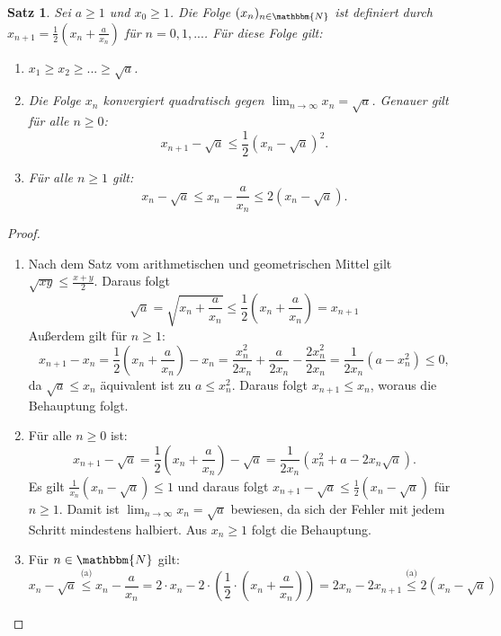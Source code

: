 \documentclass[12pt]{article}
\newcommand{\N}{\mathbbm{N}} %
\newtheorem{satz}{Satz}[section]
\begin{document}
\begin{satz}
    Sei $a \geq 1$ und $x_0 \geq 1$. Die Folge $(x_n)_{n \in \N}$ ist definiert durch $x_{n+1}= \frac{1}{2}\left(x_n+ \frac{a}{x_n}\right)$ für $n=0,1,...$. Für diese Folge gilt:
    \begin{enumerate}[label=(\alph*)]
        \item $x_1 \geq x_2 \geq ... \geq \sqrt{a}$.
        \item Die Folge $x_n$ konvergiert quadratisch gegen $\lim_{n \to \infty} x_n= \sqrt{a}$. Genauer gilt für alle $n \geq0$:
        \begin{equation*}
            x_{n+1}- \sqrt{a} \leq \frac{1}{2}(x_n-\sqrt{a})^2.
        \end{equation*}
        \item Für alle $n \geq 1$ gilt:
        \begin{equation*}
            x_n- \sqrt{a} \leq x_n - \frac{a}{x_n} \leq 2(x_n- \sqrt{a}).
        \end{equation*}
    \end{enumerate}
\end{satz}
\begin{proof} 
    \begin{enumerate}[label=(\alph*)]
        \item Nach dem Satz vom arithmetischen und geometrischen Mittel gilt $\sqrt{xy} \leq \frac{x+y}{2}$. Daraus folgt
        \begin{equation*}
            \sqrt{a}= \sqrt{x_n+\frac{a}{x_n}} \leq \frac{1}{2} \left(x_n + \frac{a}{x_n}\right)=x_{n+1}
        \end{equation*}
        Außerdem gilt für $n\geq 1$:
        \begin{equation*}
            x_{n+1}-x_n= \frac{1}{2} \left(x_n+ \frac{a}{x_n} \right)-x_n= \frac{x_n^2}{2x_n}+ \frac{a}{2x_n}- \frac{2x_n^2}{2x_n}= \frac{1}{2x_n}(a-x_n^2)\leq0,
        \end{equation*}
        da $\sqrt{a} \leq x_n$ äquivalent ist zu $a \leq x_n^2$. Daraus folgt $x_{n+1} \leq x_n$, woraus die Behauptung folgt.
        \item Für alle $n \geq 0$ ist:
        \begin{equation*}
            x_{n+1}-\sqrt{a}= \frac{1}{2} \left(x_n+ \frac{a}{x_n} \right)- \sqrt{a} = \frac{1}{2x_n}(x_n^2+a-2x_n\sqrt{a}).
        \end{equation*}
        Es gilt $\frac{1}{x_n}(x_n-\sqrt{a})\leq 1$ und daraus folgt $x_{n+1}-\sqrt{a} \leq \frac{1}{2}(x_n-\sqrt{a})$ für $n \geq1$. Damit ist $\lim_{n \to \infty} x_n = \sqrt{a}$ bewiesen, da sich der Fehler mit jedem Schritt mindestens halbiert. Aus $x_n \geq 1$ folgt die Behauptung.
        \item Für $n \in \N$ gilt:
        \begin{equation*}
            x_n-\sqrt{a} \overset{\text{(a)}}{\leq} x_n- \frac{a}{x_n}= 2 \cdot x_n - 2 \cdot \left( \frac{1}{2} \cdot  \left( x_n + \frac{a}{x_n}\right) \right) = 2x_n-2x_{n+1} \overset{\text{(a)}}{\leq} 2(x_n- \sqrt{a}) 
        \end{equation*} 
    \end{enumerate}
\end{proof}
\end{document}
